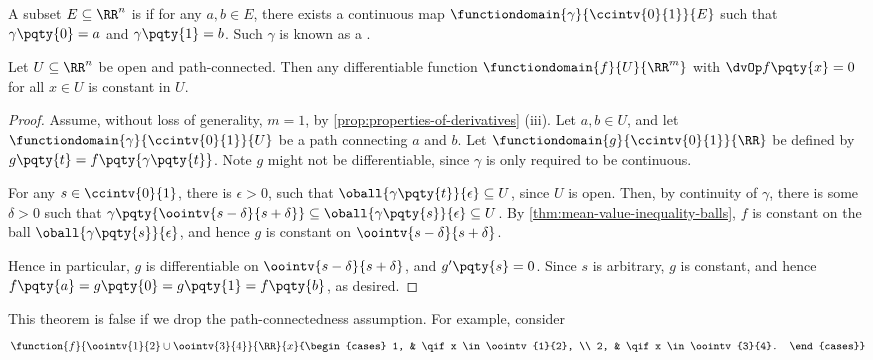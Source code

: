 \begin{definition}
    A subset \(E \subseteq \RR^n\) is  if for any \(a, b \in E\), there exists a continuous map \(\functiondomain{\gamma}{\ccintv{0}{1}}{E}\) such that \(\gamma\pqty{0} = a\) and \(\gamma\pqty{1} = b\). Such \(\gamma\) is known as a .
\end{definition}

\begin{theorem}
    Let \(U \subseteq \RR^n\) be open and path-connected. Then any differentiable function \(\functiondomain{f}{U}{\RR^m}\) with \(\dvOp f\pqty{x} = 0\) for all \(x \in U\) is constant in \(U\).
\end{theorem}

\begin{proof}
    Assume, without loss of generality, \(m = 1\), by \autoref{prop:properties-of-derivatives} (iii). Let \(a, b \in U\), and let \(\functiondomain{\gamma}{\ccintv{0}{1}}{U}\) be a path connecting \(a\) and \(b\). Let \(\functiondomain{g}{\ccintv{0}{1}}{\RR}\) be defined by \(g\pqty{t} = f\pqty{\gamma\pqty{t}}\). Note \(g\) might not be differentiable, since \(\gamma\) is only required to be continuous.

    For any \(s \in \ccintv{0}{1}\), there is \(\epsilon > 0\), such that \(\oball{\gamma\pqty{t}}{\epsilon} \subseteq U\), since \(U\) is open. Then, by continuity of \(\gamma\), there is some \(\delta > 0\) such that \(\gamma\pqty{\oointv{s - \delta}{s + \delta}} \subseteq \oball{\gamma\pqty{s}}{\epsilon} \subseteq U\). By \autoref{thm:mean-value-inequality-balls}, \(f\) is constant on the ball \(\oball{\gamma\pqty{s}}{\epsilon}\), and hence \(g\) is constant on \(\oointv{s - \delta}{s + \delta}\).

    Hence in particular, \(g\) is differentiable on \(\oointv{s - \delta}{s + \delta}\), and \(g'\pqty{s} = 0\). Since \(s\) is arbitrary, \(g\) is constant, and hence \(f\pqty{a} = g\pqty{0} = g\pqty{1} = f\pqty{b}\), as desired.
\end{proof}

This theorem is false if we drop the path-connectedness assumption. For example, consider
\[
    \function{f}{\oointv{1}{2} \cup \oointv{3}{4}}{\RR}{x}{\begin{cases}
        1, & \qif x \in \oointv{1}{2}, \\
        2, & \qif x \in \oointv{3}{4}.
    \end{cases}}
\]

